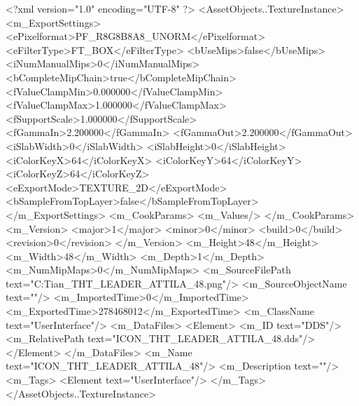 <?xml version="1.0" encoding="UTF-8" ?>
<AssetObjects..TextureInstance>
	<m_ExportSettings>
		<ePixelformat>PF_R8G8B8A8_UNORM</ePixelformat>
		<eFilterType>FT_BOX</eFilterType>
		<bUseMips>false</bUseMips>
		<iNumManualMips>0</iNumManualMips>
		<bCompleteMipChain>true</bCompleteMipChain>
		<fValueClampMin>0.000000</fValueClampMin>
		<fValueClampMax>1.000000</fValueClampMax>
		<fSupportScale>1.000000</fSupportScale>
		<fGammaIn>2.200000</fGammaIn>
		<fGammaOut>2.200000</fGammaOut>
		<iSlabWidth>0</iSlabWidth>
		<iSlabHeight>0</iSlabHeight>
		<iColorKeyX>64</iColorKeyX>
		<iColorKeyY>64</iColorKeyY>
		<iColorKeyZ>64</iColorKeyZ>
		<eExportMode>TEXTURE_2D</eExportMode>
		<bSampleFromTopLayer>false</bSampleFromTopLayer>
	</m_ExportSettings>
	<m_CookParams>
		<m_Values/>
	</m_CookParams>
	<m_Version>
		<major>1</major>
		<minor>0</minor>
		<build>0</build>
		<revision>0</revision>
	</m_Version>
	<m_Height>48</m_Height>
	<m_Width>48</m_Width>
	<m_Depth>1</m_Depth>
	<m_NumMipMaps>0</m_NumMipMaps>
	<m_SourceFilePath text="C:\Users\Troy Tian\Downloads\ICON_THT_LEADER_ATTILA_48.png"/>
	<m_SourceObjectName text=""/>
	<m_ImportedTime>0</m_ImportedTime>
	<m_ExportedTime>278468012</m_ExportedTime>
	<m_ClassName text="UserInterface"/>
	<m_DataFiles>
		<Element>
			<m_ID text="DDS"/>
			<m_RelativePath text="ICON_THT_LEADER_ATTILA_48.dds"/>
		</Element>
	</m_DataFiles>
	<m_Name text="ICON_THT_LEADER_ATTILA_48"/>
	<m_Description text=""/>
	<m_Tags>
		<Element text="UserInterface"/>
	</m_Tags>
</AssetObjects..TextureInstance>


